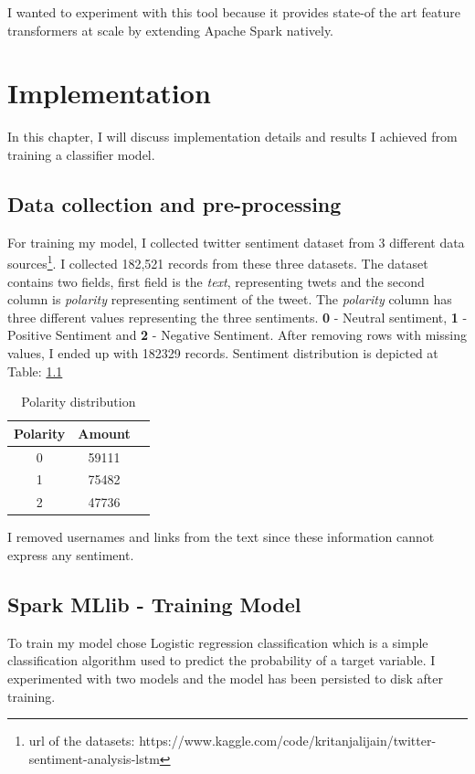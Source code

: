 \documentclass[12pt,a4paper]{report}
\begin{document}
I wanted to experiment with this tool because it provides state-of the art feature transformers at scale by extending Apache Spark natively. 

\chapter{Implementation}
In this chapter, I will discuss implementation details and results I achieved from training a classifier model.
\section{Data collection and pre-processing}
For training my model, I collected twitter sentiment dataset from 3 different data sources\footnote{url of the datasets: https://www.kaggle.com/code/kritanjalijain/twitter-sentiment-analysis-lstm}. I collected 182,521 records from these three datasets. The dataset contains two fields, first field is the \textit{text}, representing twets and the second column is \textit{polarity} representing sentiment of the tweet. The \textit{polarity} column has three different values representing the three sentiments. \textbf{0} - Neutral sentiment, \textbf{1} - Positive Sentiment and \textbf{2} - Negative Sentiment. After removing rows with missing values, I ended up with 182329 records. Sentiment distribution is depicted at Table: \ref{tab:svm}
\begin{table}[h]
\centering
    \begin{tabular}{c c c}
        Polarity & Amount \\
        \midrule
        0 & 59111 \\
        1 & 75482 \\
        2 & 47736 \\
        \bottomrule
    \end{tabular}
    \caption{Polarity distribution}
    \label{tab:svm}
\end{table}

I removed usernames and links from the text since these information cannot express any sentiment.

\section{Spark MLlib - Training Model}
To train my model chose Logistic regression classification which is a simple classification algorithm used to predict the probability of a target variable. I experimented with two models and the model has been persisted to disk after training.
\end{document}

